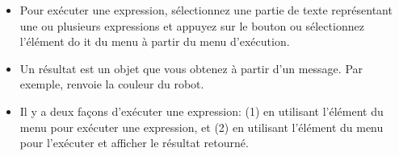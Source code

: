 \documentclass[a4paper,10pt,twoside]{book}
\begin{document}
\begin{itemize}
\item Pour ex\'ecuter une expression, s\'electionnez une partie de texte repr\'esentant une ou plusieurs expressions et appuyez sur le bouton  ou s\'electionnez l'\'el\'ement do it du menu  \`a partir du menu d'ex\'ecution. 

\item  Un r\'esultat est un objet que vous obtenez \`a partir d'un message. Par exemple,  renvoie la couleur du robot. 

\item  Il y a deux fa\c cons d'ex\'ecuter une expression: (1) en utilisant l'\'el\'ement  du menu pour ex\'ecuter une expression, et (2) en utilisant l'\'el\'ement  du menu pour l'ex\'ecuter et afficher le r\'esultat retourn\'e. 


\end{itemize}


\ifx\wholebook\relax\else
    
\end{document}
